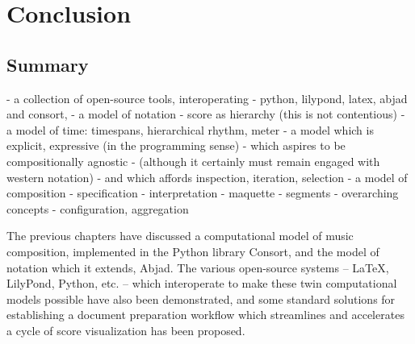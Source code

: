 \chapter{Conclusion}
\label{chap:conclusion}

\section{Summary}
\label{sec:summary}

\begin{markdown}
-   a collection of open-source tools, interoperating
    -   python, lilypond, latex, abjad and consort,
-   a model of notation
    -   score as hierarchy (this is not contentious)
    -   a model of time: timespans, hierarchical rhythm, meter
    -   a model which is explicit, expressive (in the programming sense)
    -   which aspires to be compositionally agnostic
    -   (although it certainly must remain engaged with western notation)
    -   and which affords inspection, iteration, selection
-   a model of composition
    -   specification
    -   interpretation
    -   maquette
    -   segments
-   overarching concepts
    -   configuration, aggregation
\end{markdown}

The previous chapters have discussed a computational model of music
composition, implemented in the Python library Consort, and the model of
notation which it extends, Abjad. The various open-source systems -- \LaTeX{},
LilyPond, Python, etc. -- which interoperate to make these twin computational
models possible have also been demonstrated, and some standard solutions for
establishing a document preparation workflow which streamlines and accelerates
a cycle of score visualization has been proposed.

